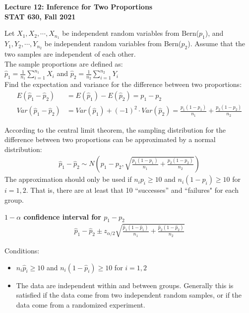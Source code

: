 \documentclass[12pt, fleqn]{article}\usepackage[]{graphicx}\usepackage[]{color}
\begin{document}
\setlength\parindent{0pt}

\begin{center}
\textbf{Lecture 12: Inference for Two Proportions}\\
\textbf{STAT 630, Fall 2021}\\
\hrulefill
\end{center}

Let $X_1, X_2, \cdots, X_{n_1}$ be independent random variables from Bern($p_1$), and $Y_1, Y_2, \cdots, Y_{n_2}$ be independent random variables from Bern($p_2$).  Assume that the two samples are independent of each other.\\

The sample proportions are defined as:\\
$\hat{p}_1 = \frac{1}{n_1} \sum_{i=1}^{n_1} X_i$ and $\hat{p}_2 = \frac{1}{n_2} \sum_{i=1}^{n_2} Y_i$\\

Find the expectation and variance for the difference between two proportions:
{\color{blue}
\begin{align*}
E(\hat{p}_1 - \hat{p}_2) &= E(\hat{p}_1) - E(\hat{p}_2) = p_1 - p_2\\
Var(\hat{p}_1 - \hat{p}_2) &= Var(\hat{p}_1) + (-1)^2 \cdot Var(\hat{p}_2) = \frac{p_1 (1-p_1)}{n_1} + \frac{p_2(1-p_2)}{n_2}
\end{align*}
}

According to the central limit theorem, the sampling distribution for the difference between two proportions can be approximated by a normal distribution:
\begin{align*}
\hat{p}_1 - \hat{p}_2 \sim N \left( p_1 - p_2, \sqrt{\frac{p_1 (1-p_1)}{n_1} + \frac{p_2(1-p_2)}{n_2}} \right)
\end{align*}
The approximation should only be used if $n_i p_i \geq 10$ and $n_i (1-p_i) \geq 10$ for $i=1,2$.  That is, there are at least that 10 ``successes'' and ``failures" for each group.\\
\vspace{11pt}

\textbf{$1-\alpha$ confidence interval for $p_1 - p_2$}
\begin{align*}
\hat{p}_1 - \hat{p}_2 \pm z_{\alpha / 2} \sqrt{\frac{\hat{p}_1 (1-\hat{p}_1)}{n_1} + \frac{\hat{p}_2(1-\hat{p}_2)}{n_2}}
\end{align*}

Conditions:
\begin{itemize}
\item $n_i \hat{p}_i \geq 10$ and $n_i (1-\hat{p}_i) \geq 10$ for $i=1,2$
\item The data are independent within and between groups.  Generally this is satisfied if the data come from two independent random samples, or if the data come from a randomized experiment.
\end{itemize}
\clearpage
\end{document}
